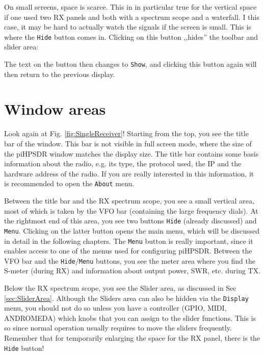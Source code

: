 \documentclass[12pt]{book}
\def\rett#1{\texttt{\color{red}#1}}
\def\bltt#1{\texttt{\color{blue}#1}}
\def\pH{pi\-HPSDR\xspace}
\begin{document}
On small screens, space is scarce. This in in particular true
for the vertical space if one used two RX panels and both
with a spectrum scope and a waterfall. I this case, it may be
hard to actually watch the signals if the screen is small.
This is where the \rett{Hide} button comes in. Clicking on
this button ,,hides'' the toolbar and slider area:


The text on the button then changes to \rett{Show}, and
clicking this button again will then return to the
previous display.

\section{Window areas}

Look again at Fig. \ref{fig:SingleReceiver}! Starting from the
top, you see the title bar of the window. This bar is not visible
in full screen mode, where the size of the \pH window matches
the display size. The title bar contains some basis information
about the radio, e.g.  its type, the protocol used, the  IP
and the hardware address of the radio. If you are really interested
in this information, it is recommended to open the
\bltt{About} menu.

Between the title bar and the RX spectrum scope, you see
a small vertical area, most of  which is taken by the VFO bar
(containing the large frequency dials). At the rightmost
end of this area, you see two buttons \rett{Hide} (already
discussed) and \rett{Menu}. Clicking on the latter button opens
the main menu, which will be discussed in detail in the following
chapters. The \rett{Menu} button is really important, since it
enables access to one of the menus used for configuring \pH.
Between the VFO bar and the \rett{Hide}/\rett{Menu} buttons,
you see the meter area where you find the S-meter (during RX)
and information about output power, SWR, etc. during TX.

Below the RX  spectrum scope, you see the Slider area, 
as discussed in Sec \ref{sec:SliderArea}. Although the Sliders area can also
be hidden via the \bltt{Display} menu, you should not do so
unless you have a controller (GPIO, MIDI, ANDROMEDA) which knobs that
you can assign to the slider functions. This is so since
normal operation usually requires to move the sliders frequently.
Remember that for temporarily enlarging the space for
the RX  panel, there is the \rett{Hide} button!
\end{document}

